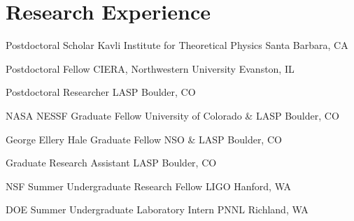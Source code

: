 \section{Research Experience}


		{Postdoctoral Scholar}
		{Kavli Institute for Theoretical Physics}
		{Santa Barbara, CA}
		{}
		{}



		{Postdoctoral Fellow}
		{CIERA, Northwestern University}
		{Evanston, IL}
		{}
		{}


		{Postdoctoral Researcher}
		{LASP}
		{Boulder, CO}
		{}
		{}


		{NASA NESSF Graduate Fellow}
		{University of Colorado \& LASP}
		{Boulder, CO}
		{}
		{}

		{George Ellery Hale Graduate Fellow}
		{NSO \& LASP}
		{Boulder, CO}
		{}
		{}

		{Graduate Research Assistant}
		{LASP}
		{Boulder, CO}
		{}
		{}



		{NSF Summer Undergraduate Research Fellow}
		{LIGO}
		{Hanford, WA}
		{}
		{}

		{DOE Summer Undergraduate Laboratory Intern}
		{PNNL}
		{Richland, WA}
		{}
		{}
